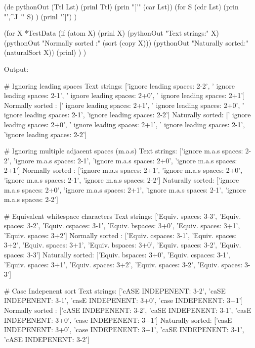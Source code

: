 \begin{wideverbatim}

(de pythonOut (Ttl Lst)
   (prinl Ttl)
   (prin "['" (car Lst))
   (for S (cdr Lst)
      (prin "',^J '" S) )
   (prinl "']") )

(for X *TestData
   (if (atom X)
      (prinl X)
      (pythonOut "Text strings:" X)
      (pythonOut "Normally sorted :" (sort (copy X)))
      (pythonOut "Naturally sorted:" (naturalSort X))
      (prinl) ) )

Output:

# Ignoring leading spaces
Text strings:
['ignore leading spaces: 2-2',
 ' ignore leading spaces: 2-1',
 '  ignore leading spaces: 2+0',
 '   ignore leading spaces: 2+1']
Normally sorted :
['   ignore leading spaces: 2+1',
 '  ignore leading spaces: 2+0',
 ' ignore leading spaces: 2-1',
 'ignore leading spaces: 2-2']
Naturally sorted:
['  ignore leading spaces: 2+0',
 '   ignore leading spaces: 2+1',
 ' ignore leading spaces: 2-1',
 'ignore leading spaces: 2-2']

# Ignoring multiple adjacent spaces (m.a.s)
Text strings:
['ignore m.a.s spaces: 2-2',
 'ignore m.a.s  spaces: 2-1',
 'ignore m.a.s   spaces: 2+0',
 'ignore m.a.s    spaces: 2+1']
Normally sorted :
['ignore m.a.s    spaces: 2+1',
 'ignore m.a.s   spaces: 2+0',
 'ignore m.a.s  spaces: 2-1',
 'ignore m.a.s spaces: 2-2']
Naturally sorted:
['ignore m.a.s   spaces: 2+0',
 'ignore m.a.s    spaces: 2+1',
 'ignore m.a.s  spaces: 2-1',
 'ignore m.a.s spaces: 2-2']

\end{wideverbatim}

\begin{wideverbatim}

# Equivalent whitespace characters
Text strings:
['Equiv. spaces: 3-3',
 'Equiv.
spaces: 3-2',
 'Equiv.cspaces: 3-1',
 'Equiv.bspaces: 3+0',
 'Equiv.
spaces: 3+1',
 'Equiv.	spaces: 3+2']
Normally sorted :
['Equiv.cspaces: 3-1',
 'Equiv.	spaces: 3+2',
 'Equiv.
spaces: 3+1',
 'Equiv.bspaces: 3+0',
 'Equiv.
spaces: 3-2',
 'Equiv. spaces: 3-3']
Naturally sorted:
['Equiv.bspaces: 3+0',
 'Equiv.cspaces: 3-1',
 'Equiv.
spaces: 3+1',
 'Equiv.	spaces: 3+2',
 'Equiv.
spaces: 3-2',
 'Equiv. spaces: 3-3']

# Case Indepenent sort
Text strings:
['cASE INDEPENENT: 3-2',
 'caSE INDEPENENT: 3-1',
 'casE INDEPENENT: 3+0',
 'case INDEPENENT: 3+1']
Normally sorted :
['cASE INDEPENENT: 3-2',
 'caSE INDEPENENT: 3-1',
 'casE INDEPENENT: 3+0',
 'case INDEPENENT: 3+1']
Naturally sorted:
['casE INDEPENENT: 3+0',
 'case INDEPENENT: 3+1',
 'caSE INDEPENENT: 3-1',
 'cASE INDEPENENT: 3-2']

\end{wideverbatim}


